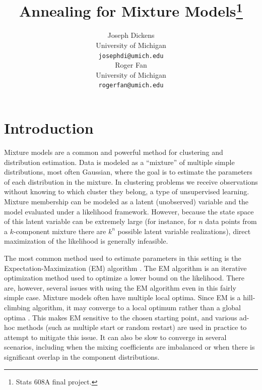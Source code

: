 \documentclass{article}
\theoremstyle{definition}
\theoremstyle{algodesc}
\begin{document}
\title{Annealing for Mixture Models\thanks{Stats 608A final project.}}
\author{
  Joseph Dickens \\
  University of Michigan \\
  \texttt{josephdi@umich.edu} \\
\And
  Roger Fan \\
  University of Michigan\\
  \texttt{rogerfan@umich.edu} \\
}

\maketitle


\section{Introduction} \label{sec:intro}

Mixture models are a common and powerful method for clustering and distribution estimation. Data is modeled as a ``mixture'' of multiple simple distributions, most often Gaussian, where the goal is to estimate the parameters of each distribution in the mixture. In clustering problems we receive observations without knowing to which cluster they belong, a type of unsupervised learning. Mixture membership can be modeled as a latent (unobserved) variable and the model evaluated under a likelihood framework. However, because the state space of this latent variable can be extremely large (for instance, for $n$ data points from a $k$-component mixture there are $k^n$ possible latent variable realizations), direct maximization of the likelihood is generally infeasible.

The most common method used to estimate parameters in this setting is the Expectation-Maximization (EM) algorithm \cite{dempsterlairdrubin77}. The EM algorithm is an iterative optimization method used to optimize a lower bound on the likelihood. There are, however, several issues with using the EM algorithm even in this fairly simple case. Mixture models often have multiple local optima. Since EM is a hill-climbing algorithm, it may converge to a local optimum rather than a global optima \cite{wu83}. This makes EM sensitive to the chosen starting point, and various ad-hoc methods (such as multiple start or random restart) are used in practice to attempt to mitigate this issue. It can also be slow to converge in several scenarios, including when the mixing coefficients are imbalanced or when there is significant overlap in the component distributions.
\end{document}
